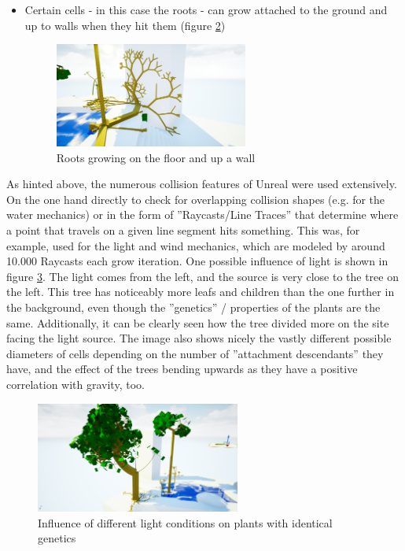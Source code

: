 \documentclass[11pt]{scrartcl}
\begin{document}
\begin{itemize}
\begin{figure}
 		 \label{fig:SelfCollision}
	\end{figure}
	\item Certain cells - in this case the roots - can grow attached to the ground and up to walls when they hit them (figure \ref{fig:RootsOnFloor})
	\begin{figure} 
 		 \centering
 		    \includegraphics[width=0.6\textwidth]{SS_Roots.png}
 		 \caption{Roots growing on the floor and up a wall}
 		 \label{fig:RootsOnFloor}
	\end{figure}
\end{itemize}
As hinted above, the numerous collision features of Unreal were used extensively. On the one hand directly to check for overlapping collision shapes (e.g. for the water mechanics) or in the form of ''Raycasts/Line Traces'' that determine where a point that travels on a given line segment hits something. This was, for example, used for the light and wind mechanics, which are modeled by around 10.000 Raycasts each grow iteration.
One possible influence of light is shown in figure \ref{fig:GrowToLight}. The light comes from the left, and the source is very close to the tree on the left. This tree has noticeably more leafs and children than the one further in the background, even though the ''genetics'' / properties of the plants are the same. Additionally, it can be clearly seen how the tree divided more on the site facing the light source. The image also shows nicely the vastly different possible diameters of cells depending on the number of ''attachment descendants'' they have, and the effect of the trees bending upwards as they have a positive correlation with gravity, too. 

\begin{figure}
 	 \centering
 	    \includegraphics[width=0.6\textwidth]{SS_GrowToLight.png}
 	 \caption{Influence of different light conditions on plants with identical genetics}
 	 \label{fig:GrowToLight}
\end{figure}
\end{document}
